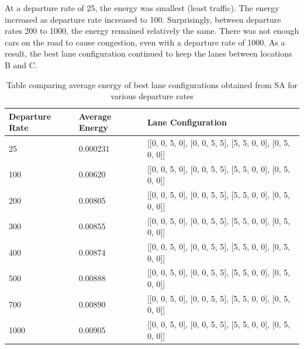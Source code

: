 \documentclass[11pt]{article}
\begin{document}
At a departure rate of 25, the energy was smallest (least traffic). The energy increased as departure rate increased to 100. Surprisingly, between departure rates 200 to 1000, the energy remained relatively the same. There was not enough cars on the road to cause congestion, even with a departure rate of 1000. As a result, the best lane configuration continued to keep the lanes between locations B and C.

\begin{table}[H]
\centering
\begin{tabular}{|l|l|l|}
\hline
Departure Rate & Average Energy & Lane Configuration\\ \hline
25 & 0.000231 &  [[0, 0, 5, 0], [0, 0, 5, 5], [5, 5, 0, 0], [0, 5, 0, 0]]\\ \hline
100 & 0.00620 & [[0, 0, 5, 0], [0, 0, 5, 5], [5, 5, 0, 0], [0, 5, 0, 0]]\\ \hline
200 &  0.00805 & [[0, 0, 5, 0], [0, 0, 5, 5], [5, 5, 0, 0], [0, 5, 0, 0]]\\ \hline
300 &  0.00855 &  [[0, 0, 5, 0], [0, 0, 5, 5], [5, 5, 0, 0], [0, 5, 0, 0]]\\ \hline
400 & 0.00874 &  [[0, 0, 5, 0], [0, 0, 5, 5], [5, 5, 0, 0], [0, 5, 0, 0]]\\ \hline
500 &  0.00888 &  [[0, 0, 5, 0], [0, 0, 5, 5], [5, 5, 0, 0], [0, 5, 0, 0]]\\ \hline
700 & 0.00890  & [[0, 0, 5, 0], [0, 0, 5, 5], [5, 5, 0, 0], [0, 5, 0, 0]] \\ \hline
1000 &  0.00905&  [[0, 0, 5, 0], [0, 0, 5, 5], [5, 5, 0, 0], [0, 5, 0, 0]] \\ \hline
\end{tabular}
\caption{\label{table:departResults} Table comparing average energy of best lane configurations obtained from SA for various departure rates}
\end{table}
\end{document}
